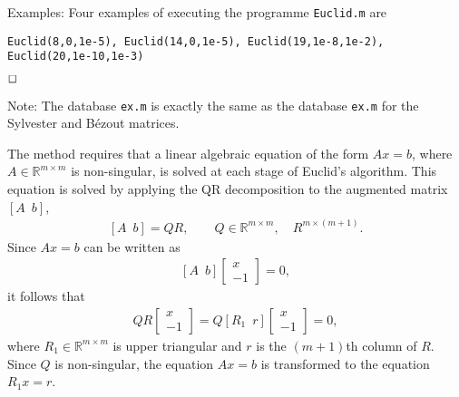 \documentclass[a4paper,11pt]{article}
\begin{document}
\vspace{0.25cm}

Examples: Four examples of executing the programme \texttt{Euclid.m} are
%

\texttt{Euclid(8,0,1e-5), Euclid(14,0,1e-5), Euclid(19,1e-8,1e-2), Euclid(20,1e-10,1e-3)}

$\hfill\Box$




Note: The database \texttt{ex.m} is exactly the same as
 the database \texttt{ex.m} for the Sylvester  and B\'ezout matrices.

The method requires that a linear algebraic equation of the form $Ax=b$,
where $A\in \mathbb{R}^{m \times m}$ is non-singular, is solved
at each stage of Euclid's algorithm. This equation is solved by applying the
\textrm{QR} decomposition to the augmented matrix $\left[A\, \,\,b\right]$,
%
\begin{eqnarray*}
\left[A\, \,\,b\right]=QR,\qquad Q\in\mathbb{R}^{m\times m},\quad R^{m \times (m+1)}.
\end{eqnarray*}
%
Since $Ax=b$ can be written as
%
\begin{eqnarray*}
\left[
A \,\, \,b \right]
%
\left[\begin{array}{c} x \\ -1\end{array}\right]=0,
\end{eqnarray*}
%
it follows that
%
\begin{eqnarray*}
QR
%
\left[\begin{array}{c} x \\ -1\end{array}\right]=Q\left[
R_1 \,\, \,r  \right]
%
\left[\begin{array}{c} x \\ -1\end{array}\right]=0,
\end{eqnarray*}
%
where $R_1\in\mathbb{R}^{m\times m}$ is upper triangular and $r$ is the
$(m+1)$th column of $R$.
Since $Q$ is non-singular, the equation $Ax=b$ is transformed to the
equation $R_1x=r$.
\end{document}
